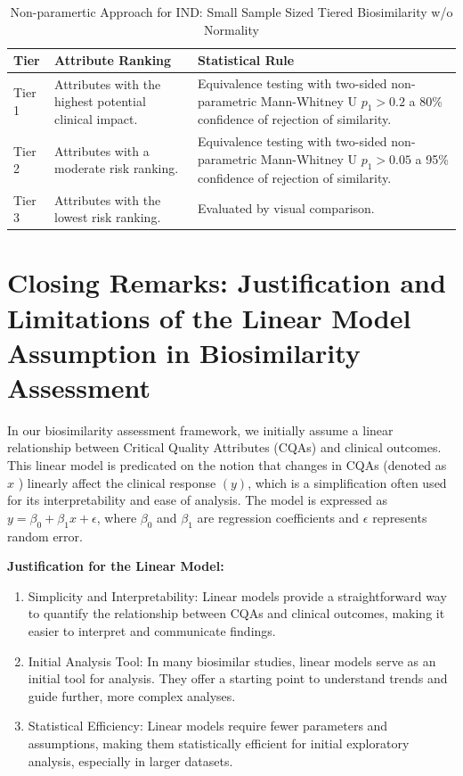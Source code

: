 \documentclass[
  12pt,
  a4paper,
]{article}
\providecommand{\tightlist}{%
  \setlength{\itemsep}{0pt}\setlength{\parskip}{0pt}}
\numberwithin{equation}{section}
\theoremstyle{plain}
\theoremstyle{definition}
\theoremstyle{remark}
\theoremstyle{note}
\begin{document}
\begin{table}[h]
\centering
\caption{Non-paramertic Approach for IND: Small Sample Sized Tiered Biosimilarity w/o Normality}
\begin{tabular}{|l|p{6cm}|p{6cm}|}
\hline
\textbf{Tier} & \textbf{Attribute Ranking} & \textbf{Statistical Rule} \\ \hline
Tier 1 & Attributes with the highest potential clinical impact. & Equivalence testing with two-sided non-parametric Mann-Whitney U $p_1 > 0.2$ a 80\% confidence of rejection of similarity. \\ \hline
Tier 2 & Attributes with a moderate risk ranking. & Equivalence testing with two-sided non-parametric Mann-Whitney U $p_1 > 0.05$ a 95\% confidence of rejection of similarity. \\ \hline
Tier 3 & Attributes with the lowest risk ranking. & Evaluated by visual comparison. \\ \hline
\end{tabular}
\end{table}

\newpage

\hypertarget{closing-remarks-justification-and-limitations-of-the-linear-model-assumption-in-biosimilarity-assessment}{%
\section{Closing Remarks: Justification and Limitations of the Linear
Model Assumption in Biosimilarity
Assessment}\label{closing-remarks-justification-and-limitations-of-the-linear-model-assumption-in-biosimilarity-assessment}}

In our biosimilarity assessment framework, we initially assume a linear
relationship between Critical Quality Attributes (CQAs) and clinical
outcomes. This linear model is predicated on the notion that changes in
CQAs (denoted as \(x\) ) linearly affect the clinical response \((y)\),
which is a simplification often used for its interpretability and ease
of analysis. The model is expressed as \(y=\beta_0+\beta_1 x+\epsilon\),
where \(\beta_0\) and \(\beta_1\) are regression coefficients and
\(\epsilon\) represents random error.

\textbf{Justification for the Linear Model:}

\begin{enumerate}
\def\labelenumi{\arabic{enumi}.}
\tightlist
\item
  Simplicity and Interpretability: Linear models provide a
  straightforward way to quantify the relationship between CQAs and
  clinical outcomes, making it easier to interpret and communicate
  findings.
\item
  Initial Analysis Tool: In many biosimilar studies, linear models serve
  as an initial tool for analysis. They offer a starting point to
  understand trends and guide further, more complex analyses.
\item
  Statistical Efficiency: Linear models require fewer parameters and
  assumptions, making them statistically efficient for initial
  exploratory analysis, especially in larger datasets.
\end{enumerate}
\end{document}
